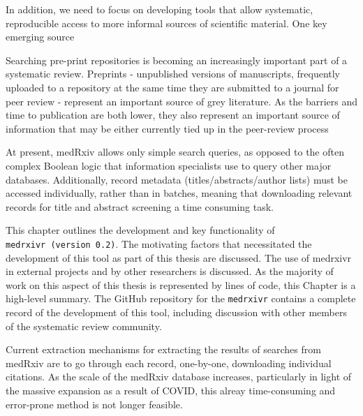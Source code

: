 \documentclass[a4paper, twoside]{templates/ociamthesis}
\begin{document}
In addition, we need to focus on developing tools that allow systematic, reproducible access to more informal sources of scientific material. One key emerging source

Searching pre-print repositories is becoming an increasingly important part of a systematic review. Preprints - unpublished versions of manuscripts, frequently uploaded to a repository at the same time they are submitted to a journal for peer review - represent an important source of grey literature. As the barriers and time to publication are both lower, they also represent an important source of information that may be either currently tied up in the peer-review process

At present, medRxiv allows only simple search queries, as opposed to the often complex Boolean logic that information specialists use to query other major databases. Additionally, record metadata (titles/abstracts/author lists) must be accessed individually, rather than in batches, meaning that downloading relevant records for title and abstract screening a time consuming task.

This chapter outlines the development and key functionality of \texttt{medrxivr\ (version\ 0.2)}. The motivating factors that necessitated the development of this tool as part of this thesis are discussed. The use of medrxivr in external projects and by other researchers is discussed. As the majority of work on this aspect of this thesis is represented by lines of code, this Chapter is a high-level summary. The GitHub repository for the \texttt{medrxivr} contains a complete record of the development of this tool, including discussion with other members of the systematic review community.

Current extraction mechanisms for extracting the results of searches from medRxiv are to go through each record, one-by-one, downloading individual citations. As the scale of the medRxiv database increases, particularly in light of the massive expansion as a result of COVID, this alreay time-consuming and error-prone method is not longer feasible.
\end{document}
